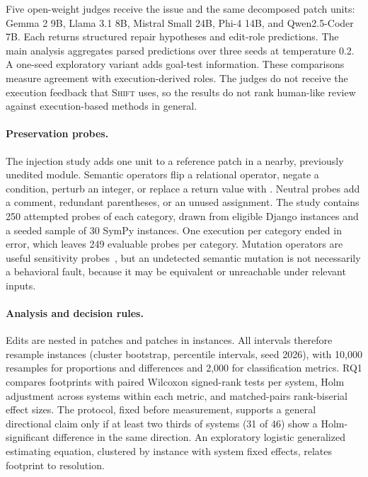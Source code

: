 \documentclass[a4paper,fleqn]{cas-sc}
\newcommand{\tool}{\textsc{Shift}}
\newcommand{\code}[1]{\texttt{\detokenize{#1}}}
\begin{document}
Five open-weight judges receive the issue and the same decomposed patch units: Gemma 2 9B, Llama 3.1 8B, Mistral Small 24B, Phi-4 14B, and Qwen2.5-Coder 7B. Each returns structured repair hypotheses and edit-role predictions. The main analysis aggregates parsed predictions over three seeds at temperature 0.2. A one-seed exploratory variant adds goal-test information. These comparisons measure agreement with execution-derived roles. The judges do not receive the execution feedback that \tool{} uses, so the results do not rank human-like review against execution-based methods in general.

\paragraph{Preservation probes.}
The injection study adds one unit to a reference patch in a nearby, previously unedited module. Semantic operators flip a relational operator, negate a condition, perturb an integer, or replace a return value with \code{None}. Neutral probes add a comment, redundant parentheses, or an unused assignment. The study contains 250 attempted probes of each category, drawn from eligible Django instances and a seeded sample of 30 SymPy instances. One execution per category ended in error, which leaves 249 evaluable probes per category. Mutation operators are useful sensitivity probes~\citep{jia2011mutation,just2014mutants}, but an undetected semantic mutation is not necessarily a behavioral fault, because it may be equivalent or unreachable under relevant inputs.

\paragraph{Analysis and decision rules.}
Edits are nested in patches and patches in instances. All intervals therefore resample instances (cluster bootstrap, percentile intervals, seed 2026), with 10,000 resamples for proportions and differences and 2,000 for classification metrics. RQ1 compares footprints with paired Wilcoxon signed-rank tests per system, Holm adjustment across systems within each metric, and matched-pairs rank-biserial effect sizes. The protocol, fixed before measurement, supports a general directional claim only if at least two thirds of systems (31 of 46) show a Holm-significant difference in the same direction. An exploratory logistic generalized estimating equation, clustered by instance with system fixed effects, relates footprint to resolution.
\end{document}
